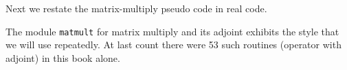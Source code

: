 \par
Next we restate the matrix-multiply pseudo code in real code.
\begin{comment}
in a language called \bx{Loptran}\footnote{
        The programming language, Loptran,
        is based on a dialect of Fortran called Ratfor.
        For more details, see Appendix A.},
a language designed for
exposition and research
in model fitting and optimization in physical sciences.
\end{comment}

The module \texttt{matmult}
for matrix multiply and its adjoint
exhibits the style that we will use repeatedly.
At last count there were 53 such routines
(operator with adjoint)
in this book alone.
\begin{comment}
Notice that the module \texttt{matmult}
does not explicitly erase its output before it begins,
as does the psuedo code.
That is because Loptran will always erase for you
the space required for the operator's output.
Loptran also defines a logical variable {\tt adj}
for you to distinguish your computation of the adjoint
{\tt x=x+B'*y}
from the forward operation
{\tt y=y+B*x}. 
In computerese, the two lines beginning \#\% are macro expansions
that take compact bits of information which expand
into the verbose boilerplate that Fortran requires.
Loptran is Fortran with these macro expansions.
You can always see how they expand by looking at
\texttt{http://sep.stanford.edu/sep/prof/gee/Lib/}.

\par
What is new in Fortran 90, and will be a big help to us,
is that instead of a subroutine with a single entry.
\end{comment}

